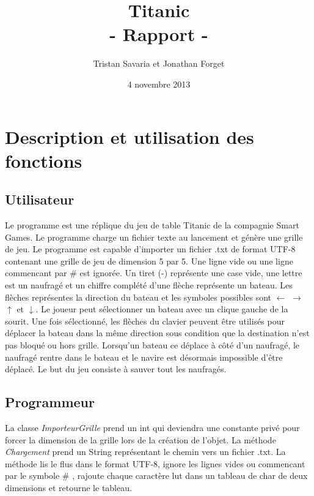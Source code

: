 \documentclass[11pt, french]{article} %
\title{Titanic\\- Rapport -}
\author{Tristan Savaria et Jonathan Forget}
\date{4 novembre 2013}
\begin{document}
\maketitle
\newpage
\tableofcontents
\newpage
\section{Description et utilisation des fonctions}
\paragraph{}

\subsection{Utilisateur}

Le programme est une réplique du jeu de table Titanic de la compagnie Smart Games. Le programme charge un fichier texte au lancement et génère une grille de jeu. Le programme est capable
d'importer un fichier .txt de format UTF-8 contenant une grille de jeu de dimension 5 par 5. Une ligne vide ou une ligne commencant par \# est ignorée. Un tiret (-) représente une case vide, une lettre est un naufragé et un chiffre complété d'une flèche représente un bateau. Les flèches représentes la direction du bateau et les symboles possibles sont $\leftarrow$ $\rightarrow$ $\uparrow$ et $\downarrow$. Le joueur peut sélectionner un bateau avec un clique gauche de la sourit. Une fois sélectionné, les flèches du clavier peuvent être utilisés pour déplacer la bateau dans la même direction sous condition que la destination n'est pas bloqué ou hors grille. Lorsqu'un bateau ce déplace à côté d'un naufragé, le naufragé rentre dans le bateau et le navire est désormais impossible d'être déplacé. Le but du jeu consiste à sauver tout les naufragés.

\subsection{Programmeur}
La classe \textit{ImporteurGrille} prend un int qui deviendra une constante privé pour forcer la dimension de la grille lors de la création de l'objet. La méthode \textit{Chargement} prend un String représentant le chemin vers un fichier .txt. La méthode lis le flus dans le format UTF-8, ignore les lignes vides ou commencant par le symbole \# , rajoute chaque caractère lut dans un tableau de char de deux dimensions et retourne le tableau.
\newline
\end{document}

